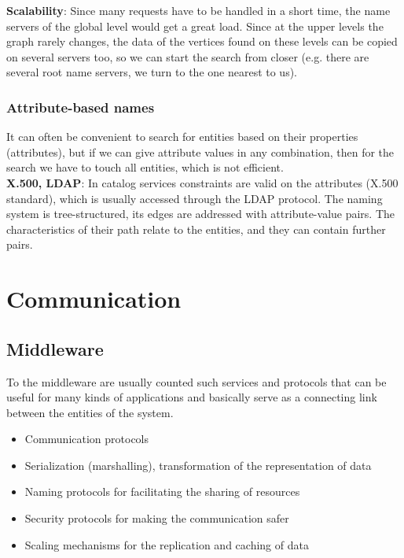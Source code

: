 \documentclass[margin=0px]{article}
\begin{document}
\noindent \textbf{Scalability}: Since many requests have to be handled in a short time, the name servers of the global level
would get a great load. Since at the upper levels the graph rarely changes, the data of the vertices found on these levels can be
copied on several servers too, so we can start the search from closer (e.g. there are
several root name servers, we turn to the one nearest to us).

\subsubsection{Attribute-based names}

It can often be convenient to search for entities based on their properties (attributes), but if we can give attribute values
in any combination, then for the search we have to touch all entities, which
is not efficient. \\

\noindent \textbf{X.500, LDAP}: In catalog services constraints are valid on the attributes (X.500 standard), which is usually
accessed through the LDAP protocol. The naming system is tree-structured, its edges are addressed with attribute-value pairs.
The characteristics of their path relate to the entities, and they can contain further pairs.

\section{Communication}

\subsection{Middleware}

To the middleware are usually counted such services and protocols that can be useful for many kinds of
applications and basically serve as a connecting link between the entities of the system.

\begin{itemize}
    \item	Communication protocols
    \item	Serialization (marshalling), transformation of the representation of data
    \item	Naming protocols for facilitating the sharing of resources
    \item	Security protocols for making the communication safer
    \item	Scaling mechanisms for the replication and caching of data
\end{itemize}
\end{document}
